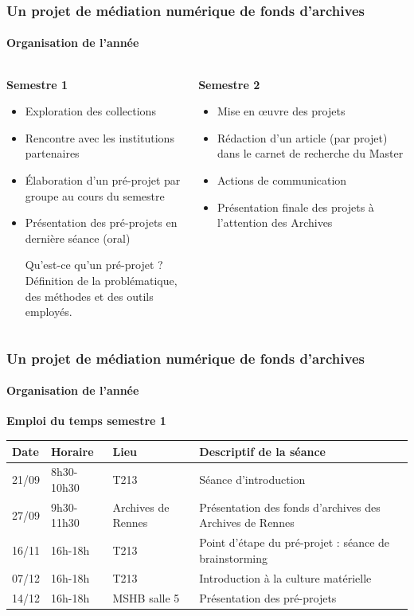 \documentclass[xcolor=table]{beamer}
\begin{document}
\begin{frame}[plain]
\frametitle{Un projet de m\'ediation num\'erique de fonds d'archives}
\framesubtitle{Organisation de l'ann\'ee}
\begin{columns}
\begin{column}{6cm}
\textbf{Semestre 1}
\begin{itemize}
    \item Exploration des collections
    \item Rencontre avec les institutions partenaires
    \item \'Elaboration d'un pr\'e-projet par groupe au cours du semestre
    \item Pr\'esentation des pr\'e-projets en derni\`ere s\'eance (oral)
\begin{beamerboxesrounded}[3]{Qu'est-ce qu'un pr\'e-projet ?}
D\'efinition de la probl\'ematique,\\
des m\'ethodes et des outils employ\'es.
\end{beamerboxesrounded}
\end{itemize}
\end{column}
\begin{column}{6cm}
\textbf{Semestre 2}
\begin{itemize}
    \item Mise en \oe uvre des projets
    \item R\'edaction d'un article (par projet) dans le carnet de recherche du Master
    \item Actions de communication
    \item Pr\'esentation finale des projets \`a l'attention des Archives
\end{itemize}
\end{column}
\end{columns}
\end{frame}

\begin{frame}[plain]
\frametitle{Un projet de m\'ediation num\'erique de fonds d'archives}
\framesubtitle{Organisation de l'ann\'ee}
\textbf{Emploi du temps semestre 1}
\begin{tabular}{|p{2cm}|p{2cm}|p{}|p{4cm}|}
  \hline
  \rowcolor{gray} Date & Horaire & Lieu & Descriptif de la s\'eance\\
  \hline
   21/09 & 8h30-10h30  & T213 & S\'eance d'introduction\\
   \hline
   27/09 & 9h30-11h30 & Archives de Rennes & Pr\'esentation des fonds d'archives des Archives de Rennes\\
   \hline
   16/11 & 16h-18h & T213 & Point d'\'etape du pr\'e-projet : s\'eance de brainstorming\\
   \hline
   07/12 & 16h-18h & T213 & Introduction \`a la culture mat\'erielle\\
    \hline
   14/12 & 16h-18h & MSHB salle 5 & Pr\'esentation des pr\'e-projets\\
  \hline
\end{tabular}
\end{frame}
\end{document}
